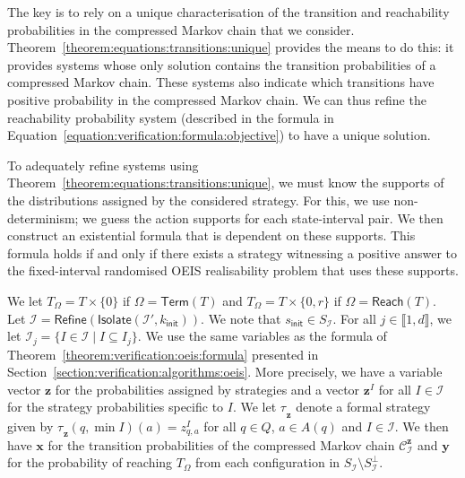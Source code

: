 \documentclass[a4paper,UKenglish,cleveref,autoref,thm-restate,colorlinks]{lipics-v2021}
\newcommand{\init}{\mathsf{init}}
\newcommand{\integerInterval}[1]{\llbracket{}#1\rrbracket{}}
\newcommand{\mdpStateSpace}{S}
\newcommand{\ocStateSpace}{Q}
\newcommand{\ocState}{q}
\newcommand{\ocCount}{k}
\newcommand{\ocConfig}{s}
\newcommand{\ocActionSpace}{A}
\newcommand{\ocAction}{a}
\newcommand{\counterUB}{r}
\newcommand{\mchain}{\mathcal{C}}
\newcommand{\intPart}{\mathcal{I}}
\newcommand{\interval}{I}
\newcommand{\intNum}{d}
\newcommand{\intIndex}{j}
\newcommand{\compressChainStrat}[1]{\mchain^{#1}_{\intPart}}
\newcommand{\compressChainStateSpace}{\mdpStateSpace_{\intPart}}
\newcommand{\compressChainStateSpaceStar}{\mdpStateSpace_{\intPart}^{\bot}}
\newcommand{\varTrans}{x}
\newcommand{\varTransTuple}{\mathbf{\varTrans}}
\newcommand{\varObj}{y}
\newcommand{\varObjTuple}{\mathbf{\varObj}}
\newcommand{\varStrat}{z}
\newcommand{\varStratI}{\mathbf{\varStrat}^{\interval}}
\newcommand{\varStratTuple}{\mathbf{\varStrat}}
\newcommand{\compressChainSymbolic}{\compressChainStrat{\varStratTuple}}
\newcommand{\objective}{\Omega}
\newcommand{\reach}[1]{\mathsf{Reach}(#1)}
\newcommand{\target}{T}
\newcommand{\termination}{\mathsf{Term}}
\newcommand{\selectiveTermination}[1]{\termination({#1})}
\newcommand{\stratBGeneric}[1]{{\tau_{#1}}}
\newcommand{\stratB}{\stratBGeneric{}}
\begin{document}
The key is to rely on a unique characterisation of the transition and reachability probabilities in the compressed Markov chain that we consider.
Theorem~\ref{theorem:equations:transitions:unique} provides the means to do this: it provides systems whose only solution contains the transition probabilities of a compressed Markov chain.
These systems also indicate which transitions have positive probability in the compressed Markov chain.
We can thus refine the reachability probability system (described in the formula in Equation~\eqref{equation:verification:formula:objective}) to have a unique solution.

To adequately refine systems using Theorem~\ref{theorem:equations:transitions:unique}, we must know the supports of the distributions assigned by the considered strategy.
For this, we use non-determinism; we guess the action supports for each state-interval pair.
We then construct an existential formula that is dependent on these supports.
This formula holds if and only if there exists a strategy witnessing a positive answer to the fixed-interval randomised OEIS realisability problem that uses these supports.

We let $\target_\objective=\target\times\{0\}$ if $\objective=\selectiveTermination{\target}$ and $\target_\objective=\target\times\{0, \counterUB\}$ if $\objective=\reach{\target}$.
Let $\intPart=\mathsf{Refine}(\mathsf{Isolate}(\intPart', \ocCount_\init))$.
We note that $\ocConfig_\init\in\compressChainStateSpace$.
For all $\intIndex\in\integerInterval{1, \intNum}$, we let $\intPart_\intIndex = \{\interval\in\intPart\mid\interval\subseteq\interval_\intIndex\}$.
We use the same variables as the formula of Theorem~\ref{theorem:verification:oeis:formula} presented in Section~\ref{section:verification:algorithms:oeis}.
More precisely, we have a variable vector $\varStratTuple$ for the probabilities assigned by strategies and a vector $\varStratI$ for all $\interval\in\intPart$ for the strategy probabilities specific to $\interval$.
We let $\stratB_{\varStratTuple}$ denote a formal strategy given by $\stratB_{\varStratTuple}(\ocState, \min\interval)(\ocAction) = \varStrat^\interval_{\ocState, \ocAction}$ for all $\ocState\in\ocStateSpace$, $\ocAction\in\ocActionSpace(\ocState)$ and $\interval\in\intPart$.
We then have $\varTransTuple$ for the transition probabilities of the compressed Markov chain $\compressChainSymbolic$ and $\varObjTuple$ for the probability of reaching $\target_\objective$ from each configuration in $\compressChainStateSpace\setminus\compressChainStateSpaceStar$.
\end{document}
